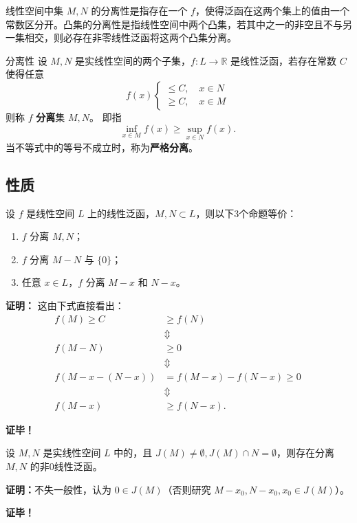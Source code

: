 

线性空间中集 $M,N$ 的分离性是指存在一个 $f$，使得泛函在这两个集上的值由一个常数区分开。凸集的分离性是指线性空间中两个凸集，若其中之一的非空且不与另一集相交，则必存在非零线性泛函将这两个凸集分离。

\begin{definition}{分离性}
设 $M,N$ 是实线性空间的两个子集，$f:L\rightarrow\mathbb R$ 是线性泛函，若存在常数 $C$ 使得任意 
\begin{equation}
f(x)\left\{\begin{aligned}\leq C,\quad x\in N\\
\geq C,\quad x\in M
\end{aligned}\right.~
\end{equation}
则称 $f$ \textbf{分离}集 $M,N$。
即指
\begin{equation}
\inf_{x\in M}f(x)\geq\sup_{x\in N}f(x).~
\end{equation}
当不等式中的等号不成立时，称为\textbf{严格分离}。
\end{definition}
\subsection{性质}
\begin{theorem}{}
设 $f$ 是线性空间 $L$ 上的线性泛函，$M,N\subset L$，则以下3个命题等价：
\begin{enumerate}
\item $f$ 分离 $M,N$；
\item $f$ 分离 $M-N$ 与 $\{0\}$；
\item 任意 $x\in L$，$f$ 分离 $M-x$ 和 $N-x$。
\end{enumerate}
\end{theorem}
\textbf{证明：}
这由下式直接看出：
\begin{equation}
\begin{aligned}
f(M)\geq C&\geq f(N)\\
&\Updownarrow \\
f(M-N)&\geq0\\
&\Updownarrow \\
f(M-x-(N-x))&=f(M-x)-f(N-x)\geq0\\
&\Updownarrow\\
f(M-x)&\geq f(N-x).
\end{aligned}~ 
\end{equation}


\textbf{证毕！}


\begin{theorem}{}
设 $M,N$ 是实线性空间 $L$ 中的，且 $J(M)\neq\emptyset,J(M)\cap N=\emptyset$，则存在分离 $M,N$ 的非0线性泛函。
\end{theorem}

\textbf{证明：}不失一般性，认为 $0\in J(M)$（否则研究 $M-x_0,N-x_0,x_0\in J(M)$）。


\textbf{证毕！}


